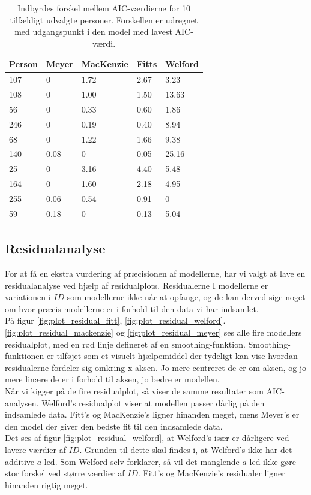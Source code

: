 \begin{table}[h]
\centering
\begin{tabular}{lllll}
Person & Meyer  & MacKenzie & Fitts  & Welford \\\hline
107    & 0      & 1.72      & 2.67   & 3.23    \\
108    & 0      & 1.00      & 1.50   & 13.63   \\
56     & 0      & 0.33      & 0.60   & 1.86    \\
246    & 0      & 0.19      & 0.40   & 8,94    \\
68     & 0      & 1.22      & 1.66   & 9.38    \\
140    & 0.08   & 0         & 0.05   & 25.16   \\
25     & 0      & 3.16      & 4.40   & 5.48    \\
164    & 0      & 1.60      & 2.18   & 4.95    \\
255    & 0.06   & 0.54      & 0.91   & 0       \\
59     & 0.18   & 0         & 0.13   & 5.04
\end{tabular}
\caption{Indbyrdes forskel mellem AIC-værdierne for 10 tilfældigt udvalgte personer. Forskellen er udregnet med udgangspunkt i den model med lavest AIC-værdi.}
\label{tab:table_analysis_aic3}
\end{table}

\subsection*{Residualanalyse}
For at få en ekstra vurdering af præcisionen af modellerne, har vi valgt at lave en residualanalyse ved hjælp af residualplots. Residualerne I modellerne er variationen i $ID$ som modellerne ikke når at opfange, og de kan derved sige noget om hvor præcis modellerne er i forhold til den data vi har indsamlet.\\
På figur \ref{fig:plot_residual_fitt}, \ref{fig:plot_residual_welford}. \ref{fig:plot_residual_mackenzie} og \ref{fig:plot_residual_meyer} ses alle fire modellers residualplot, med en rød linje defineret af en smoothing-funktion. Smoothing-funktionen er tilføjet som et visuelt hjælpemiddel der tydeligt kan vise hvordan residualerne fordeler sig omkring x-aksen. Jo mere centreret de er om aksen, og jo mere linære de er i forhold til aksen, jo bedre er modellen.\\
Når vi kigger på de fire residualplot, så viser de samme resultater som AIC-analysen. Welford's residualplot viser at modellen passer dårlig på den indsamlede data. Fitt's og MacKenzie's ligner hinanden meget, mens Meyer's er den model der giver den bedste fit til den indsamlede data.\\
Det ses af figur \ref{fig:plot_residual_welford}, at Welford's især er dårligere ved lavere værdier af $ID$. Grunden til dette skal findes i, at Welford's ikke har det additive $a$-led. Som Welford \cite{welford1968} selv forklarer, så vil det manglende $a$-led ikke gøre stor forskel ved større værdier af $ID$. Fitt's og MacKenzie's residualer ligner hinanden rigtig meget.

